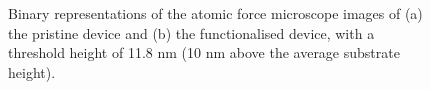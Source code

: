 \documentclass[
  a4paper,
]{scrbook}
\begin{document}
\begin{figure}
\begin{minipage}[t]{0.03\linewidth}
{\centering 


}

\end{minipage}%
%
\begin{minipage}[t]{0.01\linewidth}

{\centering 

~

}

\end{minipage}%
%
\begin{minipage}[t]{0.45\linewidth}

{\centering 


}

\end{minipage}%
%
\begin{minipage}[t]{0.01\linewidth}

{\centering 

~

}

\end{minipage}%

\caption{\label{fig-crosssection}Binary representations of the atomic
force microscope images of (a) the pristine device and (b) the
functionalised device, with a threshold height of 11.8 nm (10 nm above
the average substrate height).}

\end{figure}
\end{document}
